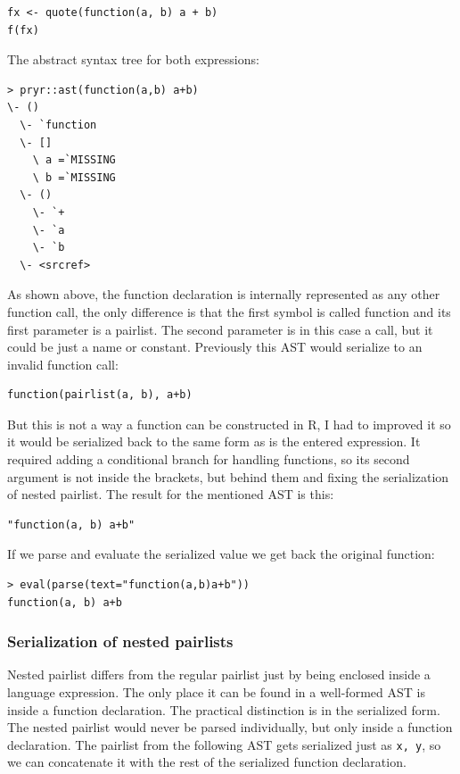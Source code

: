 \documentclass[thesis=B,english]{FITthesis}[2012/10/20]
\begin{document}
\begin{verbatim}
fx <- quote(function(a, b) a + b)
f(fx)
\end{verbatim}

The abstract syntax tree for both expressions:

\begin{verbatim}
> pryr::ast(function(a,b) a+b)
\- ()
  \- `function
  \- []
    \ a =`MISSING
    \ b =`MISSING
  \- ()
    \- `+
    \- `a
    \- `b
  \- <srcref> 
\end{verbatim}

As shown above, the function declaration is internally represented as any other function call, the only difference is that the first symbol is called function and its first parameter is a pairlist. The second parameter is in this case a call, but it could be just a name or constant. Previously this AST would serialize to an invalid function call:

\begin{verbatim}
function(pairlist(a, b), a+b)
\end{verbatim}

But this is not a way a function can be constructed in R, I had to improved it so it would be serialized back to the same form as is the entered expression. It required adding a conditional branch for handling functions, so its second argument is not inside the brackets, but behind them and fixing the serialization of nested pairlist. The result for the mentioned AST is this:

\begin{verbatim}
"function(a, b) a+b"
\end{verbatim}

If we parse and evaluate the serialized value we get back the original function:

\begin{verbatim}
> eval(parse(text="function(a,b)a+b"))
function(a, b) a+b
\end{verbatim}

\subsubsection{Serialization of nested pairlists}
Nested pairlist differs from the regular pairlist just by being enclosed inside a language expression. The only place it can be found in a well-formed AST is inside a function declaration. The practical distinction is in the serialized form. The nested pairlist would never be parsed individually, but only inside a function declaration. 
The pairlist from the following AST gets serialized just as \verb|x, y|, so we can concatenate it with the rest of the serialized function declaration.
\end{document}
